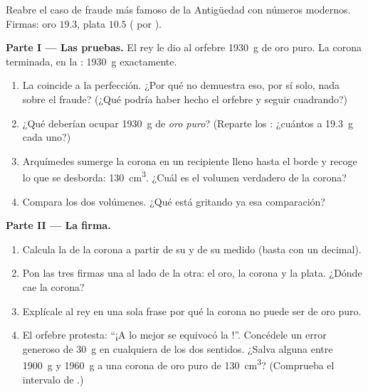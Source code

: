 \begin{problem}\label{pb:g6:density-floating:1}
Reabre el caso de fraude más famoso de la Antigüedad con números
modernos. Firmas: oro $19.3$, plata $10.5$ ( por
).

\medskip\noindent\textbf{Parte I --- Las pruebas.}
El rey le dio al orfebre \qty{1930}{g} de oro puro. La corona
terminada, en la : \qty{1930}{g} exactamente.
\begin{enumerate}
  \item La  coincide a la perfección. ¿Por qué no demuestra
        eso, por sí solo, nada sobre el fraude? (¿Qué podría haber
        hecho el orfebre y seguir cuadrando?)
  \item ¿Qué  deberían ocupar \qty{1930}{g} de \emph{oro
        puro}? (Reparte los : ¿cuántos
         a \qty{19.3}{g} cada uno?)
  \item Arquímedes sumerge la corona en un recipiente lleno hasta el
        borde y recoge lo que se desborda: \qty{130}{cm^3}. ¿Cuál es
        el volumen verdadero de la corona?
  \item Compara los dos volúmenes. ¿Qué está gritando ya esa
        comparación?
\end{enumerate}

\medskip\noindent\textbf{Parte II --- La firma.}
\begin{enumerate}[resume]
  \item Calcula la  de la corona a partir de su  y de
        su  medido (basta con un decimal).
  \item Pon las tres firmas una al lado de la otra: el oro, la corona
        y la plata. ¿Dónde cae la corona?
  \item Explícale al rey en una sola frase por qué la corona no puede
        ser de oro puro.
  \item El orfebre protesta: ``¡A lo mejor se equivocó la !''.
        Concédele un error generoso de \qty{30}{g} en cualquiera de
        los dos sentidos. ¿Salva alguna  entre \qty{1900}{g} y
        \qty{1960}{g} a una corona de oro puro de 
        \qty{130}{cm^3}? (Comprueba el intervalo de .)
\end{enumerate}


\end{problem}
